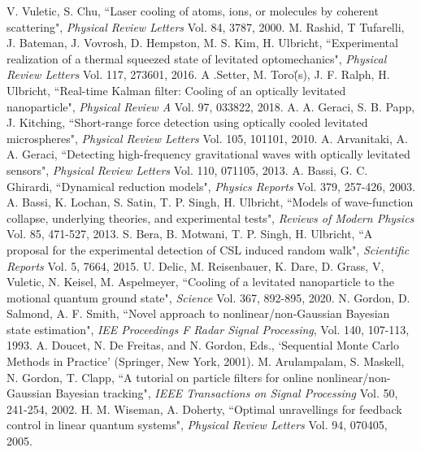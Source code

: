 \documentclass[conference]{IEEEtran}
\begin{document}
\begin{thebibliography}{1}
 V. Vuletic, S. Chu, ``Laser cooling of atoms, ions, or molecules by coherent scattering", {\em Physical Review Letters} Vol. 84, 3787, 2000.
 M. Rashid, T Tufarelli, J. Bateman, J. Vovrosh, D. Hempston, M. S. Kim, H. Ulbricht, ``Experimental realization of a thermal squeezed state of levitated optomechanics", {\em Physical Review Letters} Vol. 117, 273601, 2016.
 A .Setter, M. Toro\u(s), J. F. Ralph, H. Ulbricht, ``Real-time Kalman filter: Cooling of an optically levitated nanoparticle", {\em Physical Review A} Vol. 97, 033822, 2018.
 A. A. Geraci, S. B. Papp, J. Kitching, ``Short-range force detection using optically cooled levitated microspheres", {\em Physical Review Letters} Vol. 105, 101101, 2010. 
 A. Arvanitaki, A. A. Geraci, ``Detecting high-frequency gravitational waves with optically levitated sensors", {\em Physical Review Letters} Vol. 110, 071105, 2013.
 A. Bassi, G. C. Ghirardi, ``Dynamical reduction models", {\em Physics Reports} Vol. 379, 257-426, 2003.
 A. Bassi, K. Lochan, S. Satin, T. P. Singh, H. Ulbricht, ``Models of wave-function collapse, underlying theories, and experimental tests", {\em Reviews of Modern Physics} Vol. 85, 471-527, 2013.
 S. Bera, B. Motwani, T. P. Singh, H. Ulbricht, ``A proposal for the experimental detection of CSL induced random walk", {\em Scientific Reports} Vol. 5, 7664, 2015.
 U. Delic, M. Reisenbauer, K. Dare, D. Grass, V, Vuletic, N. Keisel, M. Aspelmeyer, ``Cooling of a levitated nanoparticle to the motional quantum ground state", {\em Science} Vol. 367, 892-895, 2020.
 N. Gordon, D. Salmond, A. F. Smith, ``Novel approach to nonlinear/non-Gaussian Bayesian state estimation", {\em IEE Proceedings F Radar Signal Processing}, Vol. 140, 107-113, 1993.
 A. Doucet, N. De Freitas, and N. Gordon, Eds., `Sequential Monte Carlo Methods in Practice' (Springer, New York, 2001).
 M. Arulampalam, S. Maskell, N. Gordon, T. Clapp, ``A tutorial on particle filters for online nonlinear/non-Gaussian Bayesian tracking", {\em IEEE Transactions on Signal Processing} Vol. 50, 241-254, 2002.
 H. M. Wiseman, A. Doherty, ``Optimal unravellings for feedback control in linear quantum systems", {\em Physical Review Letters} Vol. 94, 070405, 2005.

\end{thebibliography}
\end{document}
